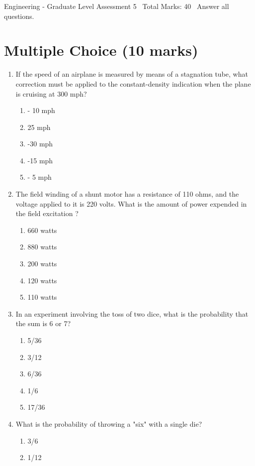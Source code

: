 \documentclass[12pt]{article}
\begin{document}
\begin{center}
Engineering - Graduate Level Assessment 5 \
Total Marks: 40 \
Answer all questions.
\end{center}

\section*{Multiple Choice (10 marks)}
\begin{enumerate}[label=\arabic*.]
\item If the speed of an airplane is measured by means of a stagnation tube, what correction
must be applied to the constant-density indication when the plane is cruising at 300 mph?
\begin{enumerate}[label=(\alph*)]
    \item - 10 mph
    \item 25 mph
    \item -30 mph
    \item -15 mph
    \item - 5 mph
\end{enumerate}
\item The field winding of a shunt motor has a resistance of 110 ohms, and the voltage applied
to it is 220 volts. What is the amount of power expended in the field excitation ?
\begin{enumerate}[label=(\alph*)]
    \item 660 watts
    \item 880 watts
    \item 200 watts
    \item 120 watts
    \item 110 watts
\end{enumerate}
\item In an experiment involving the toss of two dice, what is the probability that the sum is 6
or 7?
\begin{enumerate}[label=(\alph*)]
    \item 5/36
    \item 3/12
    \item 6/36
    \item 1/6
    \item 17/36
\end{enumerate}
\item What is the probability of throwing a "six" with a single die?
\begin{enumerate}[label=(\alph*)]
    \item 3/6
    \item 1/12

\end{enumerate}
\end{enumerate}
\end{document}
